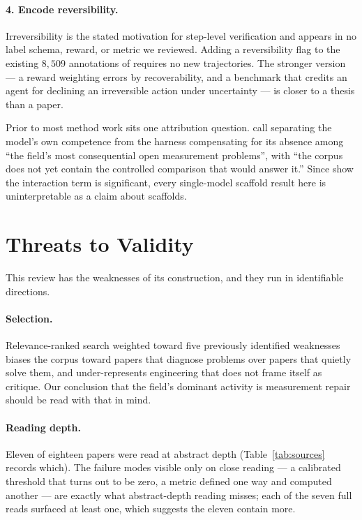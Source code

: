 \documentclass[10pt,twocolumn,a4paper]{article}
\begin{document}
\paragraph{4. Encode reversibility.}
Irreversibility is the stated motivation for step-level verification and appears in no
label schema, reward, or metric we reviewed.
Adding a reversibility flag to the existing $8{,}509$ annotations of
\citet{fan2026agentprocessbenchdiagnosingsteplevelprocess} requires no new trajectories.
The stronger version --- a reward weighting errors by recoverability, and a benchmark that
credits an agent for declining an irreversible action under uncertainty --- is closer to a
thesis than a paper.

Prior to most method work sits one attribution question.
\citet{chen2026horizongapplanningmemory} call separating the model's own competence from the
harness compensating for its absence among ``the field's most consequential open measurement
problems'', with ``the corpus does not yet contain the controlled comparison that would answer
it.''
Since \citet{fan2026screenshotstoolselicitingtool} show the interaction term is significant,
every single-model scaffold result here is uninterpretable as a claim about scaffolds.

\section{Threats to Validity}
\label{sec:threats}

This review has the weaknesses of its construction, and they run in identifiable
directions.

\paragraph{Selection.}
Relevance-ranked search weighted toward five previously identified weaknesses biases the
corpus toward papers that diagnose problems over papers that quietly solve them, and
under-represents engineering that does not frame itself as critique.
Our conclusion that the field's dominant activity is measurement repair should be read with
that in mind.

\paragraph{Reading depth.}
Eleven of eighteen papers were read at abstract depth (Table~\ref{tab:sources} records
which).
The failure modes visible only on close reading --- a calibrated threshold that turns out to
be zero, a metric defined one way and computed another --- are exactly what abstract-depth
reading misses; each of the seven full reads surfaced at least one, which suggests the
eleven contain more.
\end{document}
